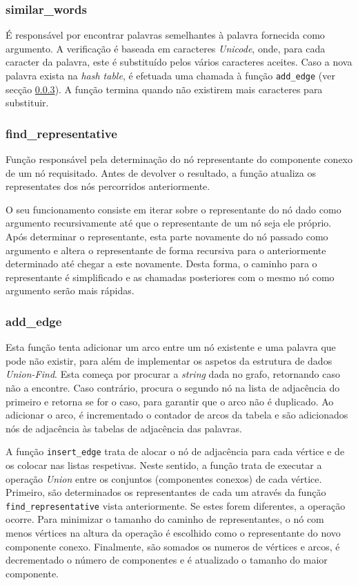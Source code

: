 \documentclass[portuguese,11pt,a4paper,titlepage]{article}
\newcommand{\foreign}[1]{\textit{#1}}
\begin{document}
\subsubsection{similar\_words}
É responsável por encontrar palavras semelhantes à palavra fornecida como argumento. A verificação é baseada em caracteres \textit{Unicode}, onde, para cada caracter da palavra, este é substituído pelos vários caracteres aceites. Caso a nova palavra exista na \foreign{hash table}, é efetuada uma chamada à função \verb|add_edge| (ver secção \ref{sssec:addedge}). A função termina quando não existirem mais caracteres para substituir.

\subsubsection{find\_representative}
Função responsável pela determinação do nó representante do componente conexo de um nó requisitado. Antes de devolver o resultado, a função atualiza os representates dos nós percorridos anteriormente.

O seu funcionamento consiste em iterar sobre o representante do nó dado como argumento recursivamente até que o representante de um nó seja ele próprio.
Após determinar o representante, esta parte novamente do nó passado como argumento e altera o representante de forma recursiva para o anteriormente determinado até chegar a este novamente.
Desta forma, o caminho para o representante é simplificado e as chamadas posteriores com o mesmo nó como argumento serão mais rápidas.

\subsubsection{add\_edge}\label{sssec:addedge}
Esta função tenta adicionar um arco entre um nó existente e uma palavra que pode não existir, para além de implementar os aspetos da estrutura de dados \textit{Union-Find}.
Esta começa por procurar a \textit{string} dada no grafo, retornando caso não a encontre. Caso contrário, procura o segundo nó na lista de adjacência do primeiro e retorna se for o caso, para garantir que o arco não é duplicado.
Ao adicionar o arco, é incrementado o contador de arcos da tabela e são adicionados nós de adjacência às tabelas de adjacência das palavras.

A função \verb|insert_edge| trata de alocar o nó de adjacência para cada vértice e de os colocar nas listas respetivas. Neste sentido, a função trata de executar a operação \foreign{Union} entre os conjuntos (componentes conexos) de cada vértice.
Primeiro, são determinados os representantes de cada um através da função
\verb|find_representative| vista anteriormente. Se estes forem diferentes, a operação ocorre. Para minimizar o tamanho do caminho de representantes, o nó com menos vértices na altura da operação é escolhido como o representante do novo componente conexo. Finalmente, são somados os numeros de vértices e arcos, é decrementado o número de componentes e é atualizado o tamanho do maior componente.
\end{document}
